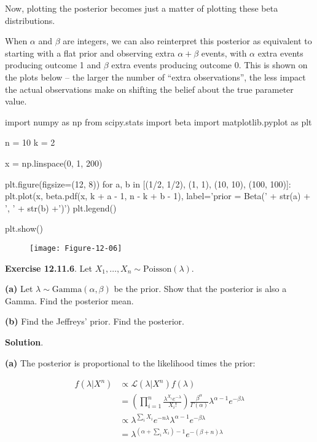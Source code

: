 Now, plotting the posterior becomes just a matter of plotting these beta
distributions.

When \(\alpha\) and \(\beta\) are integers, we can also reinterpret this
posterior as equivalent to starting with a flat prior and observing
extra \(\alpha + \beta\) events, with \(\alpha\) extra events producing
outcome 1 and \(\beta\) extra events producing outcome 0. This is shown
on the plots below -- the larger the number of ``extra observations'',
the less impact the actual observations make on shifting the belief
about the true parameter value.

\begin{python}
import numpy as np
from scipy.stats import beta
import matplotlib.pyplot as plt

n = 10
k = 2

x = np.linspace(0, 1, 200)

plt.figure(figsize=(12, 8))
for a, b in [(1/2, 1/2), (1, 1), (10, 10), (100, 100)]:
    plt.plot(x, beta.pdf(x, k + a - 1, n - k + b - 1), 
             label='prior = Beta(' + str(a) + ', ' + str(b) +')')
    plt.legend()

plt.show()
\end{python}

\begin{figure}[H]
\centering
\texttt{[image: Figure-12-06]}
\end{figure}
    
\textbf{Exercise 12.11.6}. Let
\(X_{1}, \dots, X_{n} \sim \text{Poisson}(\lambda)\).

\textbf{(a)} Let \(\lambda \sim \text{Gamma}(\alpha, \beta)\) be the
prior. Show that the posterior is also a Gamma. Find the posterior mean.

\textbf{(b)} Find the Jeffreys' prior. Find the posterior.

\textbf{Solution}.

\textbf{(a)} The posterior is proportional to the likelihood times the
prior:

\begin{align*}
f(\lambda | X^{n}) &\propto \mathcal{L}(\lambda | X^{n}) f(\lambda) \\
&= \left(\prod_{i=1}^{n} \frac{\lambda^{X_{i}}e^{-\lambda}}{X_{i}!} \right) \frac{\beta^{\alpha}}{\Gamma(\alpha)}\lambda^{\alpha - 1}e^{-\beta \lambda} \\
& \propto \lambda^{\sum_{i} X_{i}} e^{-n\lambda} \lambda^{\alpha - 1}e^{-\beta \lambda} \\
&= \lambda^{\left(\alpha + \sum_{i} X_{i} \right) - 1} e^{-(\beta + n) \lambda}
\end{align*}

